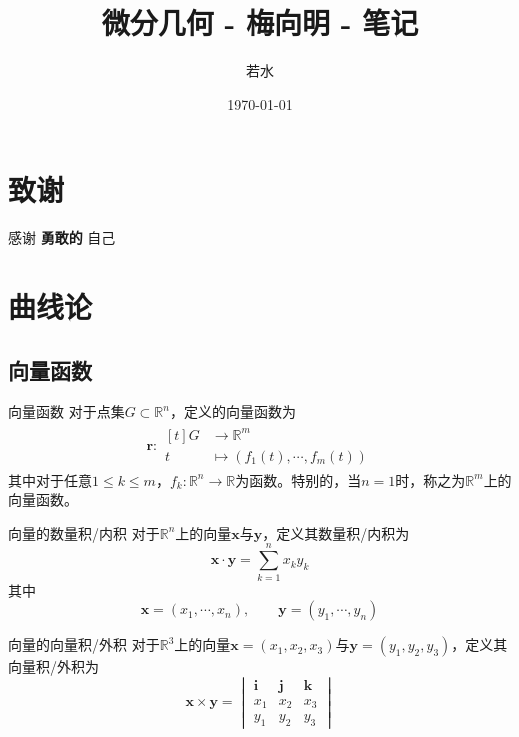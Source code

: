 \documentclass[lang = cn, scheme = chinese, thmcnt = section]{elegantbook}
\title{微分几何 - 梅向明 - 笔记}                %
\author{若水}                        %
\date{\today}                       %
\newcommand{\R}{\mathbb{R}}            %
\newcommand{\sub}{\subset}             %
\newcommand{\bs}{\boldsymbol}          %
\begin{document}
\maketitle       %

\frontmatter     %

\chapter*{致谢}


\vspace*{\fill}
	\begin{center}
		
		\large{感谢 \textbf{ 勇敢的 } 自己}
		
	\end{center}
\vspace*{\fill}

\tableofcontents %

\mainmatter      %


\chapter{曲线论}

\section{向量函数}

\begin{definition}{向量函数}
	对于点集$G\sub\R^n$，定义的向量函数为
	\begin{align*}
		\bs{r} : \begin{aligned}[t]
			G & \longrightarrow \R^m\\
			t & \longmapsto (f_1(t),\cdots,f_m(t))
		\end{aligned}
	\end{align*}
	其中对于任意$1\le k\le m$，$f_k:\R^n\to\R$为函数。特别的，当$n=1$时，称之为$\R^m$上的向量函数。
\end{definition}

\begin{definition}{向量的数量积/内积}
	对于$\R^n$上的向量$\bs{x}$与$\bs{y}$，定义其数量积/内积为
	$$
	\bs{x}\cdot \bs{y}=\sum_{k=1}^{n}x_ky_k
	$$
	其中
	$$
	\bs{x}=(x_1,\cdots,x_n),\qquad
	\bs{y}=(y_1,\cdots,y_n)
	$$
\end{definition}

\begin{definition}{向量的向量积/外积}
	对于$\R^3$上的向量$\bs{x}=(x_1,x_2,x_3)$与$\bs{y}=(y_1,y_2,y_3)$，定义其向量积/外积为
	$$
	\bs{x}\times \bs{y}=\begin{vmatrix}
		\bs{i} & \bs{j} & \bs{k}\\
		x_1 & x_2 & x_3\\
		y_1 & y_2 & y_3
	\end{vmatrix}
	$$
\end{definition}
\end{document}
